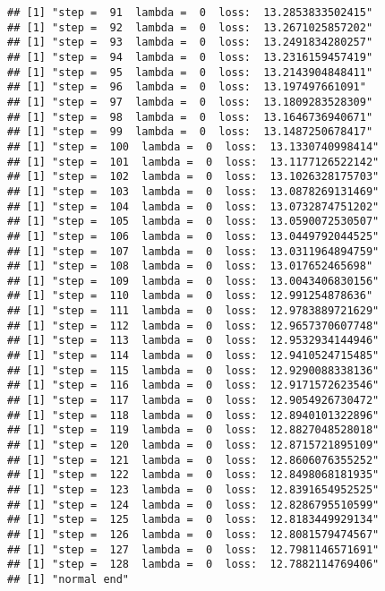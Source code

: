 \documentclass[
]{article}
\newenvironment{Shaded}{\begin{snugshade}}{\end{snugshade}}
\newcommand{\AttributeTok}[1]{\textcolor[rgb]{0.13,0.29,0.53}{#1}}
\newcommand{\CommentTok}[1]{\textcolor[rgb]{0.56,0.35,0.01}{\textit{#1}}}
\newcommand{\FunctionTok}[1]{\textcolor[rgb]{0.13,0.29,0.53}{\textbf{#1}}}
\newcommand{\NormalTok}[1]{#1}
\newcommand{\OtherTok}[1]{\textcolor[rgb]{0.56,0.35,0.01}{#1}}
\newcommand{\SpecialCharTok}[1]{\textcolor[rgb]{0.81,0.36,0.00}{\textbf{#1}}}
\newcommand{\StringTok}[1]{\textcolor[rgb]{0.31,0.60,0.02}{#1}}
\begin{document}
\begin{verbatim}
## [1] "step =  91  lambda =  0  loss:  13.2853833502415"
## [1] "step =  92  lambda =  0  loss:  13.2671025857202"
## [1] "step =  93  lambda =  0  loss:  13.2491834280257"
## [1] "step =  94  lambda =  0  loss:  13.2316159457419"
## [1] "step =  95  lambda =  0  loss:  13.2143904848411"
## [1] "step =  96  lambda =  0  loss:  13.197497661091"
## [1] "step =  97  lambda =  0  loss:  13.1809283528309"
## [1] "step =  98  lambda =  0  loss:  13.1646736940671"
## [1] "step =  99  lambda =  0  loss:  13.1487250678417"
## [1] "step =  100  lambda =  0  loss:  13.1330740998414"
## [1] "step =  101  lambda =  0  loss:  13.1177126522142"
## [1] "step =  102  lambda =  0  loss:  13.1026328175703"
## [1] "step =  103  lambda =  0  loss:  13.0878269131469"
## [1] "step =  104  lambda =  0  loss:  13.0732874751202"
## [1] "step =  105  lambda =  0  loss:  13.0590072530507"
## [1] "step =  106  lambda =  0  loss:  13.0449792044525"
## [1] "step =  107  lambda =  0  loss:  13.0311964894759"
## [1] "step =  108  lambda =  0  loss:  13.017652465698"
## [1] "step =  109  lambda =  0  loss:  13.0043406830156"
## [1] "step =  110  lambda =  0  loss:  12.991254878636"
## [1] "step =  111  lambda =  0  loss:  12.9783889721629"
## [1] "step =  112  lambda =  0  loss:  12.9657370607748"
## [1] "step =  113  lambda =  0  loss:  12.9532934144946"
## [1] "step =  114  lambda =  0  loss:  12.9410524715485"
## [1] "step =  115  lambda =  0  loss:  12.9290088338136"
## [1] "step =  116  lambda =  0  loss:  12.9171572623546"
## [1] "step =  117  lambda =  0  loss:  12.9054926730472"
## [1] "step =  118  lambda =  0  loss:  12.8940101322896"
## [1] "step =  119  lambda =  0  loss:  12.8827048528018"
## [1] "step =  120  lambda =  0  loss:  12.8715721895109"
## [1] "step =  121  lambda =  0  loss:  12.8606076355252"
## [1] "step =  122  lambda =  0  loss:  12.8498068181935"
## [1] "step =  123  lambda =  0  loss:  12.8391654952525"
## [1] "step =  124  lambda =  0  loss:  12.8286795510599"
## [1] "step =  125  lambda =  0  loss:  12.8183449929134"
## [1] "step =  126  lambda =  0  loss:  12.8081579474567"
## [1] "step =  127  lambda =  0  loss:  12.7981146571691"
## [1] "step =  128  lambda =  0  loss:  12.7882114769406"
## [1] "normal end"
\end{verbatim}

\begin{Shaded}
\end{Shaded}
\end{document}
